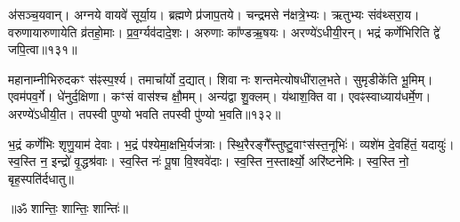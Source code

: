 अ॑सञ्च॒यवान्। अग्नये वायवे॑ सूर्या॒य। 
ब्रह्मणे प्र॑जाप॒तये। चन्द्रमसे न॑क्षत्रे॒भ्यः। 
ऋतुभ्यः संव॑थ्सरा॒य। वरुणायारुणायेति व्र॑तहो॒माः। 
प्र॒व॒र्ग्यव॑दादे॒शः। अरुणाः का᳚ण्डऋ॒षयः। 
अरण्ये॑\-ऽधी\-यी॒रन्। भद्रं कर्णेभिरिति द्वे॑ जपि॒त्वा॥१३१॥\ip


महानाम्नीभिरुदकꣳ स॑ꣴस्प॒र्श्य। तमाचा᳚र्यो द॒द्यात्। 
शिवा नः शन्तमेत्योषधी॑राल॒भते। सुमृडीके॑ति भू॒मिम्। 
एवम॑पव॒र्गे। धे॑नुर्द॒क्षिणा। कꣳसं वास॑श्च क्षौ॒मम्। 
अन्य॑द्वा शु॒क्लम्। य॑थाश॒क्ति वा। एवꣴस्वाध्याय॑धर्मे॒ण। 
अरण्ये॑\-ऽधीयी॒त। तपस्वी पुण्यो भवति तपस्वी पु॑ण्यो भ॒वति॥१३२॥\ip\anuvakamend


भ॒द्रं कर्णे॑भिः शृणु॒याम॑ देवाः। भ॒द्रं प॑श्येमा॒क्षभि॒र्यज॑त्राः। 
स्थि॒रैरङ्गै᳚स्तुष्टु॒\-वाꣳस॑स्त॒नूभिः॑। व्यशे॑म दे॒वहि॑तं॒ यदायुः॑। 
स्व॒स्ति न॒ इन्द्रो॑ वृ॒द्धश्र॑वाः। स्व॒स्ति नः॑ पू॒षा वि॒श्ववे॑दाः। 
स्व॒स्ति न॒स्तार्क्ष्यो॒ अरि॑ष्टनेमिः। स्व॒स्ति नो॒ बृह॒स्पति॑र्दधातु॥

\centerline{॥ॐ शान्तिः॒ शान्तिः॒ शान्तिः॑॥}


\noindent\centerline{\hyperref[sec:startArunaprashna]{\EightFlowerPetal\EightFlowerPetal\EightFlowerPetal}}
